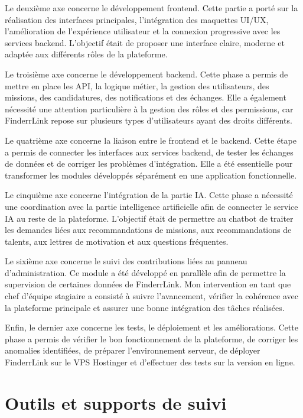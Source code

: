 Le deuxième axe concerne le développement frontend. Cette partie a porté sur la réalisation des interfaces principales, l'intégration des maquettes UI/UX, l'amélioration de l'expérience utilisateur et la connexion progressive avec les services backend. L'objectif était de proposer une interface claire, moderne et adaptée aux différents rôles de la plateforme.

Le troisième axe concerne le développement backend. Cette phase a permis de mettre en place les API, la logique métier, la gestion des utilisateurs, des missions, des candidatures, des notifications et des échanges. Elle a également nécessité une attention particulière à la gestion des rôles et des permissions, car FinderrLink repose sur plusieurs types d'utilisateurs ayant des droits différents.

Le quatrième axe concerne la liaison entre le frontend et le backend. Cette étape a permis de connecter les interfaces aux services backend, de tester les échanges de données et de corriger les problèmes d'intégration. Elle a été essentielle pour transformer les modules développés séparément en une application fonctionnelle.

Le cinquième axe concerne l'intégration de la partie IA. Cette phase a nécessité une coordination avec la partie intelligence artificielle afin de connecter le service IA au reste de la plateforme. L'objectif était de permettre au chatbot de traiter les demandes liées aux recommandations de missions, aux recommandations de talents, aux lettres de motivation et aux questions fréquentes.

Le sixième axe concerne le suivi des contributions liées au panneau d'administration. Ce module a été développé en parallèle afin de permettre la supervision de certaines données de FinderrLink. Mon intervention en tant que chef d'équipe stagiaire a consisté à suivre l'avancement, vérifier la cohérence avec la plateforme principale et assurer une bonne intégration des tâches réalisées.

Enfin, le dernier axe concerne les tests, le déploiement et les améliorations. Cette phase a permis de vérifier le bon fonctionnement de la plateforme, de corriger les anomalies identifiées, de préparer l'environnement serveur, de déployer FinderrLink sur le VPS Hostinger et d'effectuer des tests sur la version en ligne.

\section{Outils et supports de suivi}

